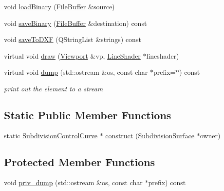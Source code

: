 \begin{DoxyCompactItemize}
\item 
void \hyperlink{classShipCAD_1_1SubdivisionControlCurve_ad2a7118ea074ce1b7f61586f08039d2a}{load\+Binary} (\hyperlink{classShipCAD_1_1FileBuffer}{File\+Buffer} \&source)
\item 
void \hyperlink{classShipCAD_1_1SubdivisionControlCurve_a6b7ecd29d30f2eb0625094e514f0e542}{save\+Binary} (\hyperlink{classShipCAD_1_1FileBuffer}{File\+Buffer} \&destination) const 
\item 
void \hyperlink{classShipCAD_1_1SubdivisionControlCurve_a9bd87373607e0b916e340f61b5c22750}{save\+To\+D\+XF} (Q\+String\+List \&strings) const 
\item 
virtual void \hyperlink{classShipCAD_1_1SubdivisionControlCurve_a4d7d8e87dc582529e763039ffe593360}{draw} (\hyperlink{classShipCAD_1_1Viewport}{Viewport} \&vp, \hyperlink{classShipCAD_1_1LineShader}{Line\+Shader} $\ast$lineshader)
\item 
virtual void \hyperlink{classShipCAD_1_1SubdivisionControlCurve_a30e8d074583a386be2ab6343cb5f8502}{dump} (std\+::ostream \&os, const char $\ast$prefix=\char`\"{}\char`\"{}) const 
\begin{DoxyCompactList}\small\item\em print out the element to a stream \end{DoxyCompactList}\end{DoxyCompactItemize}
\subsection*{Static Public Member Functions}
\begin{DoxyCompactItemize}
\item 
static \hyperlink{classShipCAD_1_1SubdivisionControlCurve}{Subdivision\+Control\+Curve} $\ast$ \hyperlink{classShipCAD_1_1SubdivisionControlCurve_a21d9226cc2fd7efcaf6f1067912a0b34}{construct} (\hyperlink{classShipCAD_1_1SubdivisionSurface}{Subdivision\+Surface} $\ast$owner)
\end{DoxyCompactItemize}
\subsection*{Protected Member Functions}
\begin{DoxyCompactItemize}
\item 
void \hyperlink{classShipCAD_1_1SubdivisionControlCurve_a48fbb761e8c85120ba7f6876d873e898}{priv\+\_\+dump} (std\+::ostream \&os, const char $\ast$prefix) const 
\end{DoxyCompactItemize}
